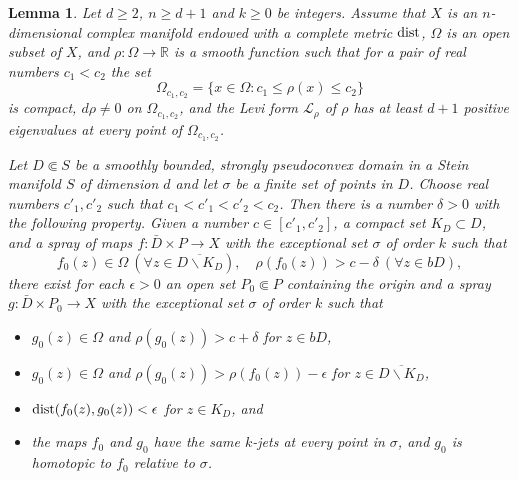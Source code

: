 \documentclass[11pt]{amsart}
\numberwithin{equation}{section}
\newtheorem{lemma}[theorem]{Lemma}
\theoremstyle{definition}
\begin{document}
\begin{lemma}
\label{MainLemma}
Let $d\ge 2$, $n\ge d+1$ and $k\ge 0$ be integers.         
Assume that $X$ is an $n$-dimensional complex manifold endowed
with a complete metric ${\rm dist}$, $\Omega$ is an open subset of $X$,
and $\rho\colon\Omega\to {\mathbb{R}}$ is a smooth function 
such that for a pair of real numbers 
$c_1<c_2$ the set 
\[
	\Omega_{c_1,c_2}= \{x\in\Omega\colon c_1\le \rho(x)\le c_2\}
\]
is compact, $d\rho\ne 0$ on $\Omega_{c_1,c_2}$, and  the Levi form 
${\mathcal{L}}_\rho$ of $\rho$ has at least $d+1$ positive eigenvalues at every point 
of $\Omega_{c_1,c_2}$.

Let $D\Subset S$ be a smoothly bounded, strongly pseudoconvex domain in a 
Stein manifold $S$ of dimension $d$ 
and let $\sigma$ be a finite set of points in $D$.
Choose real numbers $c'_1,c'_2$ such that $c_1<c'_1<c'_2< c_2$.
Then there is a number $\delta>0$ with the following property.
Given a number $c\in[c'_1,c'_2]$, a compact set $K_D\subset D$, and a spray of maps 
$f\colon\bar D\times P\to X$ with the exceptional set $\sigma$ of order $k$
such that  
\[
	f_0(z)\in\Omega\ (\forall z\in\overline{D{\backslash} K_D}),\quad  
  \rho(f_0(z))>c-\delta\  (\forall z\in bD), 
\]
there exist for each ${\epsilon}>0$ 
an open set $P_0 {\Subset} P$ containing the origin and a spray 
$g\colon\bar D\times P_0\to X$ with the exceptional set 
$\sigma$ of order $k$ such that
\begin{itemize}
\item[(i)]  $g_0(z)\in \Omega$ and  $\rho(g_0(z))>c+{\delta}$ for $z\in bD$,
\item[(ii)] $g_0(z)\in \Omega$ and  
$\rho(g_0(z))>\rho(f_0(z))-{\epsilon}$ for $z\in \overline{D{\backslash} K_D}$,
\item[(iii)] ${\rm dist }(f_0(z),g_0(z))<{\epsilon}$ for $z\in K_D$, and
\item[(iv)] the maps $f_0$ and $g_0$ have the same $k$-jets at every point in $\sigma$,
and $g_0$ is homotopic to $f_0$ relative to $\sigma$.
\end{itemize}
\end{lemma}
\end{document}
